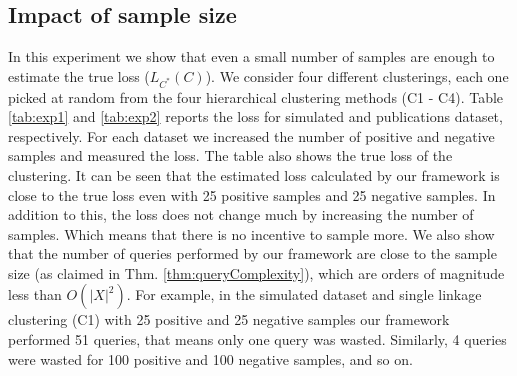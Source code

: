 \documentclass[12pt]{article}
\begin{document}

\subsection{Impact of sample size}
\label{sec:exp3}

In this experiment we show that even a small number of samples are enough to estimate the true loss ($L_{C^*}(C)$).
We consider four different clusterings, each one picked at random from the four hierarchical clustering methods (C1 - C4).
Table \ref{tab:exp1} and \ref{tab:exp2} reports the loss for simulated and publications dataset, respectively.
For each dataset we increased the number of positive and negative samples and measured the loss.
The table also shows the true loss of the clustering.
It can be seen that the estimated loss calculated by our framework is close to the true loss even with 25 positive samples and 25 negative samples.
In addition to this, the loss does not change much by increasing the number of samples.
Which means that there is no incentive to sample more.
We also show that the number of queries performed by our framework are close to the sample size (as claimed in Thm. \ref{thm:queryComplexity}), which are orders of magnitude less than $O(|X|^2)$.
For example, in the simulated dataset and single linkage clustering (C1) with 25 positive and 25 negative samples our framework performed 51 queries, that means only one query was wasted. Similarly, 4 queries were wasted for 100 positive and 100 negative samples, and so on.

 
\ifdefined\COMPLETE
\else
\end{document}
